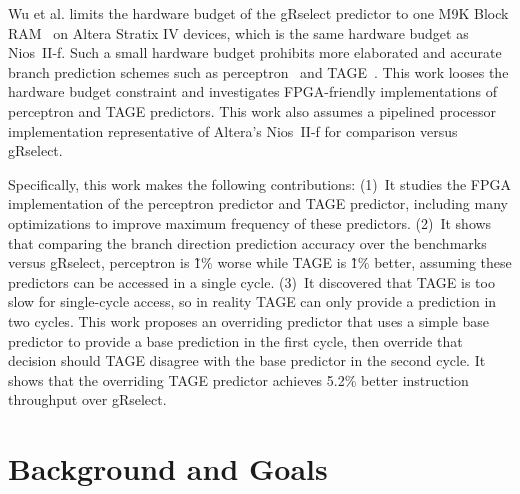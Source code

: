 \documentclass[conference]{IEEEtran}
\begin{document}
Wu et al. limits the hardware budget of the gRselect predictor to one M9K Block RAM~\cite{StratixIVM9K} on Altera Stratix IV devices, which is the same hardware budget as Nios~II-f. Such a small hardware budget prohibits more elaborated and accurate branch prediction schemes such as perceptron~\cite{perceptron} and TAGE~\cite{tage}. This work looses the hardware budget constraint and investigates FPGA-friendly implementations of perceptron and TAGE predictors. This work also assumes a pipelined processor implementation representative of Altera's Nios~II-f for comparison versus gRselect.

Specifically, this work makes the following contributions: (1)~It studies the FPGA implementation of the perceptron predictor and TAGE predictor, including many optimizations to improve maximum frequency of these predictors. (2)~It shows that comparing the branch direction prediction accuracy over the benchmarks versus gRselect, perceptron is \~1\% worse while TAGE is \~1\% better, assuming these predictors can be accessed in a single cycle. (3)~It discovered that TAGE is too slow for single-cycle access, so in reality TAGE can only provide a prediction in two cycles. This work proposes an overriding predictor that uses a simple base predictor to provide a base prediction in the first cycle, then override that decision should TAGE disagree with the base predictor in the second cycle. It shows that the overriding TAGE predictor achieves 5.2\% better instruction throughput over gRselect.

\section{Background and Goals}
\label{sec:background}

\end{document}
